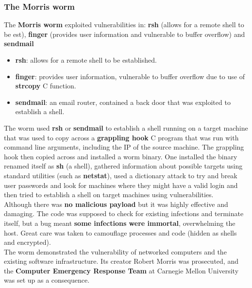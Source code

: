 \documentclass{article}
\newcommand{\np}{\vspace{8pt} \\}
\begin{document}
\subsubsection{The Morris worm}
The \textbf{Morris worm} exploited vulnerabilities in: \textbf{rsh} (allows for a remote shell to be est), \textbf{finger} (provides user information and vulnerable to buffer overflow) and \textbf{sendmail}
\begin{itemize}
	\item \textbf{rsh}: allows for a remote shell to be established.
	\item \textbf{finger}: provides user information, vulnerable to buffer overflow due to use of \textbf{strcopy} C function.
	\item \textbf{sendmail}: an email router, contained a back door that was exploited to establish a shell.
\end{itemize}
The worm used \textbf{rsh} or \textbf{sendmail} to establish a shell running on a target machine that was used to copy across a \textbf{grappling hook} C program that was run with command line arguments, including the IP of the source machine. The grappling hook then copied across and installed a worm binary. One installed the binary renamed itself as \textbf{sh} (a shell), gathered information about possible targets using standard utilities (such as \textbf{netstat}), used a dictionary attack to try and break user passwords and look for machines where they might have a valid login and then tried to establish a shell on target machines using vulnerabilities. \np
Although there was \textbf{no malicious payload} but it was highly effective and damaging. The code was supposed to check for existing infections and terminate itself, but a bug meant \textbf{some infections were immortal}, overwhelming the host. Great care was taken to camouflage processes and code (hidden as shells and encrypted). \np
The worm demonstrated the vulnerability of networked computers and the existing software infrastructure. Its creator Robert Morris was prosecuted, and the \textbf{Computer Emergency Response Team} at Carnegie Mellon University was set up as a consequence.
\end{document}
